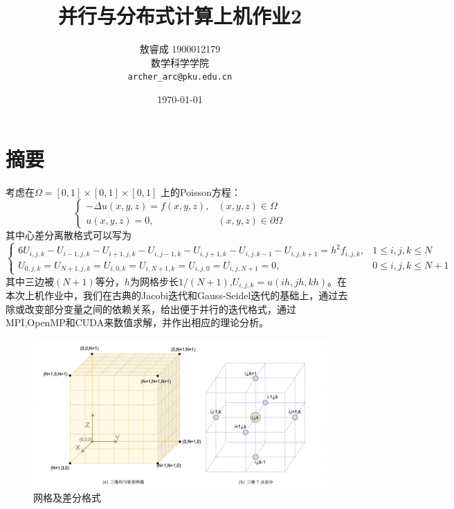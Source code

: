 \documentclass{article}
\title{并行与分布式计算上机作业2}
\date{\today}
\author{
	敖睿成 1900012179\\
	数学科学学院\\
	\texttt{archer\_arc@pku.edu.cn} \\
}
\begin{document}
	\maketitle
	\thispagestyle{fancy}
	\tableofcontents
	\section{摘要}
考虑在$\Omega=[0,1]\times[0,1]\times[0,1]$ 上的Poisson方程：
\begin{equation}\label{eq1}
	\left\{\begin{array}{rr}
		-\Delta u(x, y, z)=f(x, y, z), & (x, y, z) \in \Omega \\
		u(x, y, z)=0, & (x, y, z) \in \partial \Omega
	\end{array}\right.
\end{equation}
其中心差分离散格式可以写为
\begin{equation}\label{eq2}
\left\{\begin{aligned}
	6 U_{i, j, k}-U_{i-1, j, k}-U_{i+1, j, k}-U_{i, j-1, k}-U_{i, j+1, k}-U_{i, j, k-1}-U_{i, j, k+1}=h^{2} f_{i, j, k}, & 1 \leq i, j, k \leq N \\
	U_{0, j, k}=U_{N+1, j, k}=U_{i, 0, k}=U_{i, N+1, k}=U_{i, j, 0}=U_{i, j, N+1}=0, & 0 \leq i, j, k \leq N+1
\end{aligned}\right.
\end{equation}
其中三边被$(N+1)$等分，$h$为网格步长$1/(N+1)$,$U_{i,j,k} = u(ih,jh,kh)$。在本次上机作业中，我们在古典的Jacobi迭代和Gauss-Seidel迭代的基础上，通过去除或改变部分变量之间的依赖关系，给出便于并行的迭代格式，通过MPI,OpenMP和CUDA来数值求解，并作出相应的理论分析。
\begin{figure}[H]
	\centering
	\includegraphics[width=18cm]{./fig/poisson}
	\caption{网格及差分格式}
\end{figure}
\end{document}
